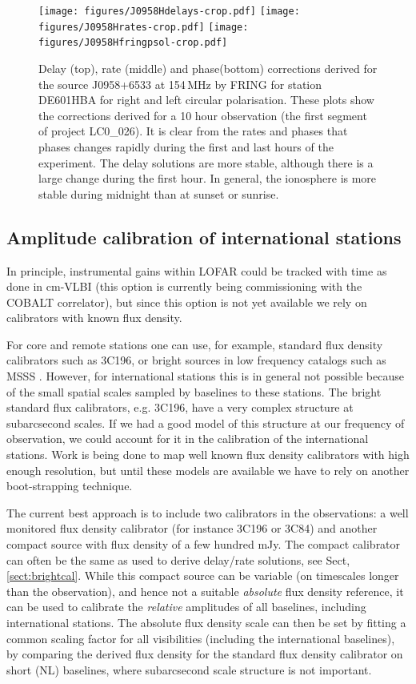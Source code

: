 \documentclass[graybox]{svmult}
\begin{document}
\begin{figure}[htbp]
\begin{center}
\texttt{[image: figures/J0958Hdelays-crop.pdf]}
\texttt{[image: figures/J0958Hrates-crop.pdf]}
\texttt{[image: figures/J0958Hfringpsol-crop.pdf]}
\caption{
Delay (top), rate (middle) and phase(bottom) corrections derived for the source
J0958+6533 at 154\,MHz by FRING for station DE601HBA for right and left
circular polarisation. These plots show the corrections derived for a 10 hour
observation (the first segment of project LC0\_026). It is clear from the rates
and phases that phases changes rapidly during the first and last hours of the
experiment. The delay solutions are more stable, although there is a large
change during the first hour. In general, the ionosphere is more stable during
midnight than at sunset or sunrise.  }

\end{center}
\end{figure}

\subsection{Amplitude calibration of international stations}
In principle, instrumental gains within LOFAR could be tracked with time as
done in cm-VLBI (this option is currently being commissioning with the COBALT
correlator), but since this option is not yet available we rely on calibrators
with known flux density.

For core and remote stations one can use, for example, standard flux density
calibrators such as 3C196, or bright sources in low frequency catalogs such as
MSSS \citep{heald14}. However, for international stations this is in general not
possible because of the small spatial scales sampled by baselines to these stations. 
The bright standard flux calibrators, e.g. 3C196, have a very complex
structure at subarcsecond scales. If we had a good model of this structure at
our frequency of observation, we could account for it in the calibration of the
international stations. Work is being done to map well known flux density
calibrators with high enough resolution, but until these models are available
we have to rely on another boot-strapping technique. 

The current best approach is to include two calibrators in the observations: a
well monitored flux density calibrator (for instance 3C196 or 3C84) and another
compact source with flux density of a few hundred mJy.  The compact calibrator
can often be the same as used to derive delay/rate solutions, see Sect,
\ref{sect:brightcal}.  While this compact source can be variable (on timescales
longer than the observation), and hence not a suitable \emph{absolute} flux density
reference, it can be used to calibrate the \emph{relative} amplitudes of all
baselines, including international stations. The absolute flux density scale can 
then be set by fitting a common scaling factor for all visibilities (including
the international baselines), by comparing the derived flux density 
for the standard flux density calibrator on short (NL) baselines, where
subarcsecond scale structure is not important.
\end{document}
